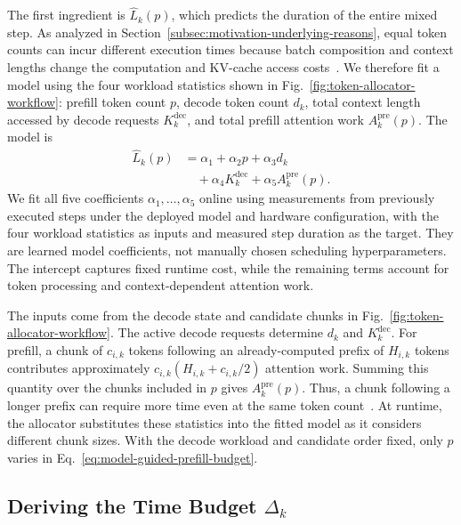 The first ingredient is $\widehat{L}_k(p)$, which predicts the duration of the entire mixed step.
As analyzed in Section~\ref{subsec:motivation-underlying-reasons}, equal token counts can incur different execution times because batch composition and context lengths change the computation and KV-cache access costs~\cite{agrawal2024vidur,ye2025flashinfer,zhang2024llmcompass}.
We therefore fit a model using the four workload statistics shown in Fig.~\ref{fig:token-allocator-workflow}: prefill token count $p$, decode token count $d_k$, total context length accessed by decode requests $K_k^{\mathrm{dec}}$, and total prefill attention work $A_k^{\mathrm{pre}}(p)$.
The model is
\begin{equation}
  \begin{aligned}
    \widehat{L}_k(p) &= \alpha_1 + \alpha_2 p + \alpha_3 d_k \\
      &\quad + \alpha_4 K_k^{\mathrm{dec}}
      + \alpha_5 A_k^{\mathrm{pre}}(p).
  \end{aligned}
  \label{eq:step-time-model}
\end{equation}
We fit all five coefficients $\alpha_1,\ldots,\alpha_5$ online using measurements from previously executed steps under the deployed model and hardware configuration, with the four workload statistics as inputs and measured step duration as the target.
They are learned model coefficients, not manually chosen scheduling hyperparameters.
The intercept captures fixed runtime cost, while the remaining terms account for token processing and context-dependent attention work.

The inputs come from the decode state and candidate chunks in Fig.~\ref{fig:token-allocator-workflow}.
The active decode requests determine $d_k$ and $K_k^{\mathrm{dec}}$.
For prefill, a chunk of $c_{i,k}$ tokens following an already-computed prefix of $H_{i,k}$ tokens contributes approximately $c_{i,k}(H_{i,k}+c_{i,k}/2)$ attention work.
Summing this quantity over the chunks included in $p$ gives $A_k^{\mathrm{pre}}(p)$.
Thus, a chunk following a longer prefix can require more time even at the same token count~\cite{qiao2026conserve}.
At runtime, the allocator substitutes these statistics into the fitted model as it considers different chunk sizes.
With the decode workload and candidate order fixed, only $p$ varies in Eq.~\ref{eq:model-guided-prefill-budget}.

\subsection{Deriving the Time Budget $\Delta_k$}
\label{subsec:joint-slo-budgeting}

